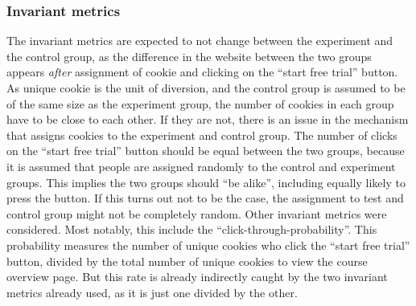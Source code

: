 \documentclass[12pt]{article}
\begin{document}
\subsubsection{Invariant metrics}
The invariant metrics are expected to not change between the experiment and the control group, as the difference in the website between the two groups appears \textit{after} assignment of cookie and clicking on the ``start free trial'' button.
\newline
As unique cookie is the unit of diversion, and the control group is assumed to be of the same size as the experiment group, the number of cookies in each group have to be close to each other. If they are not, there is an issue in the mechanism that assigns cookies to the experiment and control group.
The number of clicks on the ``start free trial'' button should be equal between the two groups, because it is assumed that people are assigned randomly to the control and experiment groups. This implies the two groups should ``be alike'', including equally likely to press the button. If this turns out not to be the case, the assignment to test and control group might not be completely random.
\newline
Other invariant metrics were considered. Most notably, this include the ``click-through-probability''. This probability measures the number of unique cookies who click the ``start free trial'' button, divided by the total number of unique cookies to view the course overview page. But this rate is already indirectly caught by the two invariant metrics already used, as it is just one divided by the other.
\end{document}
